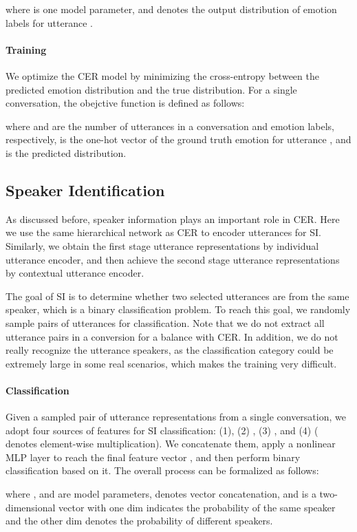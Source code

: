 \documentclass{article}
\begin{document}
\begin{CJK}{UTF8}{gbsn}
where  is one model parameter, and  denotes the output distribution of emotion labels for utterance .

\paragraph{Training}
We optimize the CER model by minimizing the cross-entropy between the predicted emotion distribution and the true distribution. For a single conversation, the obejctive function is defined as follows:

where  and  are the number of utterances in a conversation and emotion labels, respectively,  is the one-hot vector of the ground truth emotion for utterance , and  is the predicted distribution.

\subsection{Speaker Identification}

As discussed before, speaker information plays an important role in CER.
Here we use the same hierarchical network as CER to encoder utterances for SI.
Similarly, we obtain the first stage utterance representations  by individual utterance encoder,
and then achieve the second stage utterance representations  by contextual utterance encoder.

The goal of SI is to determine whether two selected utterances are from the same speaker, which is a binary classification problem. 
To reach this goal, we randomly sample  pairs of utterances for classification. 
Note that we do not extract all utterance pairs in a conversion for a balance with CER.
In addition, we do not really recognize the utterance speakers, as the classification category could be extremely large in some real scenarios, 
which makes the training very difficult.

\paragraph{Classification}
Given a sampled pair of utterance representations  from a single conversation, we adopt four sources of features for SI classification: (1), (2) ,  (3) ,  and (4)  ( denotes element-wise multiplication).  We concatenate them, apply a nonlinear MLP layer to reach the final feature vector , and then perform binary classification based on it. 
The overall process can be formalized as follows:

where ,  and  are model parameters,  denotes vector concatenation,
and  is a two-dimensional vector with one dim indicates the probability of the same speaker and the other dim denotes the  probability of different speakers.



\end{CJK}
\end{document}
